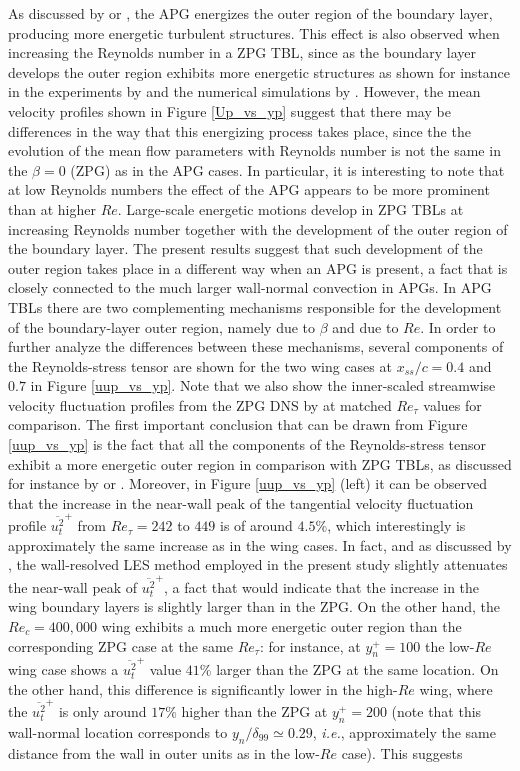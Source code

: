 As discussed by \cite{harun_et_al} or \cite{bobke_et_al}, the APG energizes the outer region of the boundary layer, producing more energetic turbulent structures. This effect is also observed when increasing the Reynolds number in a ZPG TBL, since as the boundary layer develops the outer region exhibits more energetic structures as shown for instance in the experiments by \cite{hutchins_marusic} and the numerical simulations by \cite{eitel_amor_et_al}. However, the mean velocity profiles shown in Figure \ref{Up_vs_yp} suggest that there may be differences in the way that this energizing process takes place, since the the evolution of the mean flow parameters with Reynolds number is not the same in the $\beta=0$ (ZPG) as in the APG cases. In particular, it is interesting to note that at low Reynolds numbers the effect of the APG appears to be more prominent than at higher $Re$. Large-scale energetic motions develop in ZPG TBLs at increasing Reynolds number together with the development of the outer region of the boundary layer. The present results suggest that such development of the outer region takes place in a different way when an APG is present, a fact that is closely connected to the much larger wall-normal convection in APGs. In APG TBLs there are two complementing mechanisms responsible for the development of the boundary-layer outer region, namely due to $\beta$ and due to $Re$. In order to further analyze the differences between these mechanisms, several components of the Reynolds-stress tensor are shown for the two wing cases at $x_{ss}/c=0.4$ and $0.7$ in Figure \ref{uup_vs_yp}. Note that we also show the inner-scaled streamwise velocity fluctuation profiles from the ZPG DNS by \cite{schlatter10} at matched $Re_{\tau}$ values for comparison. The first important conclusion that can be drawn from Figure \ref{uup_vs_yp} is the fact that all the components of the Reynolds-stress tensor exhibit a more energetic outer region in comparison with ZPG TBLs, as discussed for instance by \cite{kitsios_et_al} or \cite{bobke_et_al}. Moreover, in Figure \ref{uup_vs_yp} (left) it can be observed that the increase in the near-wall peak of the tangential velocity fluctuation profile $\overline{u^{2}_{t}}^{+}$ from $Re_{\tau}=242$ to $449$ is of around $4.5\%$, which interestingly is approximately the same increase as in the wing cases. In fact, and as discussed by \cite{eitel_amor_et_al}, the wall-resolved LES method employed in the present study slightly attenuates the near-wall peak of $\overline{u^{2}_{t}}^{+}$, a fact that would indicate that the increase in the wing boundary layers is slightly larger than in the ZPG. On the other hand, the $Re_{c}=400,000$ wing exhibits a much more energetic outer region than the corresponding ZPG case at the same $Re_{\tau}$: for instance, at $y^{+}_{n} = 100$ the low-$Re$ wing case shows a $\overline{u^{2}_{t}}^{+}$ value $41\%$ larger than the ZPG at the same location. On the other hand, this difference is significantly lower in the high-$Re$ wing, where the $\overline{u^{2}_{t}}^{+}$ is only around $17\%$ higher than the ZPG at $y^{+}_{n}=200$ (note that this wall-normal location corresponds to $y_{n}/\delta_{99} \simeq 0.29$, {\it i.e.}, approximately the same distance from the wall in outer units as in the low-$Re$ case). This suggests 